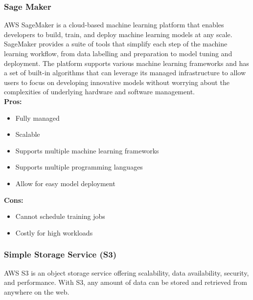        \subsubsection{Sage Maker}
        \label{aws:sage-maker}
 AWS SageMaker is a cloud-based machine learning platform that enables developers to build, train, and deploy machine learning models at any scale. SageMaker provides a suite of tools that simplify each step of the machine learning workflow, from data labelling and preparation to model tuning and deployment. The platform supports various machine learning frameworks and has a set of built-in algorithms that can leverage its managed infrastructure to allow users to focus on developing innovative models without worrying about the complexities of underlying hardware and software management.\\
        \textbf{Pros:}
        \begin{itemize}
            \item Fully managed
            \item Scalable
            \item Supports multiple machine learning frameworks
            \item Supports multiple programming languages
            \item Allow for easy model deployment
        \end{itemize}
        \textbf{Cons:}
        \begin{itemize}
            \item Cannot schedule training jobs
            \item Costly for high workloads
        \end{itemize}

        \subsubsection{Simple Storage Service (S3)} 
        \label{aws:s3}
 AWS S3 is an object storage service offering scalability, data availability, security, and performance.
 With S3, any amount of data can be stored and retrieved from anywhere on the web. 

